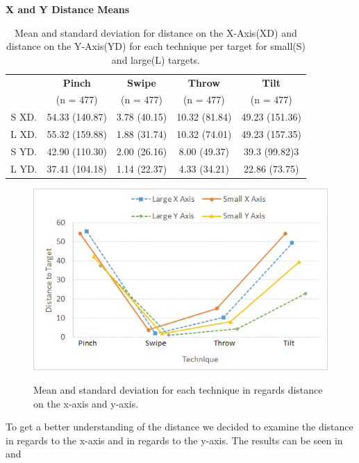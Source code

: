 \begin{table}[H]
	\centering
	\textbf{X and Y Distance Means}\\[4pt]
	\begin{adjustbox}{width=\columnwidth}
	\begin{tabular}{|c|c|c|c|c|}
		\hline
		\rowcolor[HTML]{9B9B9B} 
		& \textbf{Pinch} & \textbf{Swipe} & \textbf{Throw} & \textbf{Tilt} \\
		\rowcolor[HTML]{9B9B9B} 
		& (n = 477) & (n = 477) & (n = 477) & (n = 477) \\ \hline
		S XD. & 54.33 (140.87) & 3.78 (40.15) & 10.32 (81.84) & 49.23 (151.36) \\ \hline
		L XD. & 55.32 (159.88) & 1.88 (31.74) & 10.32 (74.01) & 49.23 (157.35) \\ \hline
		S YD. & 42.90 (110.30) & 2.00 (26.16) & 8.00 (49.37) & 39.3 (99.82)3 \\ \hline
		L YD. & 37.41 (104.18) & 1.14 (22.37) & 4.33 (34.21) & 22.86 (73.75) \\ \hline
	\end{tabular}
	\end{adjustbox}
	\caption{Mean and standard deviation for distance on the X-Axis(XD) and distance on the Y-Axis(YD) for each technique per target for small(S) and large(L) targets.}
	\label{tab:distanceXY}
\end{table}

\begin{figure}[H]
	{\includegraphics[width = 1\columnwidth ]{images/distance_axis.png}} 
	\caption{
		Mean and standard deviation for each technique in regards distance on the x-axis and y-axis.
	}
	\label{fig:distanceXYResults}
\end{figure}

To get a better understanding of the distance we decided to examine the distance in regards to the x-axis and in regards to the y-axis.
The results can be seen in  and 


